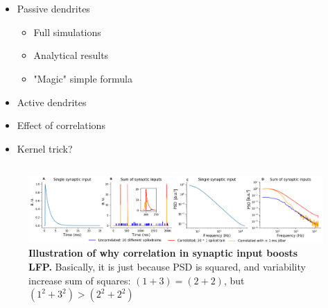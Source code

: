 \section{}
\begin{itemize}
\item Passive dendrites 
\begin{itemize}
\item Full simulations \cite{Linden2011,Leski2013}
\item Analytical results~\cite{Einevoll2013a}
\item "Magic" simple formula \cite{Mazzoni2015}
\end{itemize}
\item Active dendrites \cite{Ness2018}
\item Effect of correlations
\item Kernel trick? 
\end{itemize}

\subsection{}
\begin{figure}[!ht]
\begin{center}
\includegraphics[width=1.\textwidth]{Figures/LFP/LFP_effect_correlation_illustration.png}
\end{center}
\caption{\textbf{Illustration of why correlation in synaptic input boosts LFP.}
Basically, it is just because PSD is squared, and variability increase sum of squares: $(1+3) = (2 +2)$, but $(1^2 + 3^2) > (2^2 + 2^2)$
}
\label{LFP:fig:correlation_boost}
\end{figure}



\section{}
\label{LFP:sec:how-local-is-the-local-field-potential}

